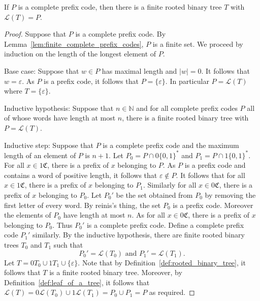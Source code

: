 \begin{lemma}\label{lem:codes_to_trees}
   If \(P\) is a complete prefix code, then there is a finite rooted binary tree \(T\) with \(\mathcal{L}(T)=P\).
\end{lemma}
\begin{proof}
    Suppose that \(P\) is a complete prefix code.
    By Lemma~\ref{lem:finite_complete_prefix_codes}, \(P\) is a finite set.
    We proceed by induction on the length of the longest element of \(P\).

    Base case: Suppose that \(w\in P\) has maximal length and \(|w|=0\). 
    It follows that \(w=\varepsilon\). As \(P\) is a prefix code, it follows that \(P=\{\varepsilon\}\).
    In particular \(P=\mathcal{L}(T)\) where \(T=\{\varepsilon\}\).

    Inductive hypothesis: Suppose that \(n\in \mathbb{N}\) and for all complete prefix codes \(P\) all of whose words have length at most \(n\), there is a finite rooted binary tree with \(P=\mathcal{L}(T)\).

    Inductive step: Suppose that \(P\) is a complete prefix code and the maximum length of an element of \(P\) is \(n+1\).
    Let \(P_0= P\cap 0\{0,1\}^*\) and  \(P_1= P\cap 1\{0,1\}^*\). 
    For all \(x\in 1 \mathfrak{C}\), there is a prefix of \(x\) belonging to \(P\). 
    As \(P\) is a prefix code and contains a word of positive length, it follows that \(\varepsilon \not\in P\).
    It follows that for all \(x\in 1 \mathfrak{C}\), there is a prefix of \(x\) belonging to \(P_1\).
    Similarly for all \(x\in 0 \mathfrak{C}\), there is a prefix of \(x\) belonging to \(P_0\).
    Let \(P_0'\) be the set obtained from \(P_0\) by removing the first letter of every word. 
    By reinis's thing, the set \(P_0\) is a prefix code. Moreover the elements of \(P_0\) have length at most \(n\).
    As for all \(x\in 0 \mathfrak{C}\), there is a prefix of \(x\) belonging to \(P_0\). Thus \(P_0'\) is a complete prefix code.
    Define a complete prefix code \(P_1'\) similarly.
    By the inductive hypothesis, there are finite rooted binary trees \(T_0\) and \(T_1\) such that
    \[P_0'=\mathcal{L}(T_0)\text{ and }P_1'=\mathcal{L}(T_1).\]
    Let \(T=0T_0\cup 1T_1 \cup \{\varepsilon\}\). Note that by Definition~\ref{def:rooted_binary_tree}, it follows that \(T\) is a finite rooted binary tree.
    Moreover, by Definition~\ref{def:leaf_of_a_tree}, it follows that \(\mathcal{L}(T)=0\mathcal{L}(T_0)\cup 1\mathcal{L}(T_1)=P_0\cup P_1=P\) as required.
\end{proof}

